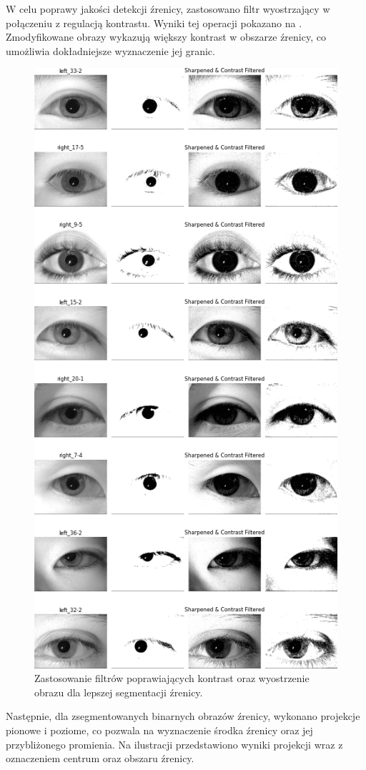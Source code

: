 \documentclass[a4paper]{article}
\begin{document}
W celu poprawy jakości detekcji źrenicy, zastosowano filtr wyostrzający w połączeniu z regulacją kontrastu. Wyniki tej operacji pokazano na . Zmodyfikowane obrazy wykazują większy kontrast w obszarze źrenicy, co umożliwia dokładniejsze wyznaczenie jej granic.

\begin{figure}[H]
    \centering
    \includegraphics[width=0.7\linewidth]{figures/eye_filters_many.png}
    \caption{Zastosowanie filtrów poprawiających kontrast oraz wyostrzenie obrazu dla lepszej segmentacji źrenicy.}
    \label{fig:eye_filters_many}
\end{figure}

Następnie, dla zsegmentowanych binarnych obrazów źrenicy, wykonano projekcje pionowe i poziome, co pozwala na wyznaczenie środka źrenicy oraz jej przybliżonego promienia. Na ilustracji  przedstawiono wyniki projekcji wraz z oznaczeniem centrum oraz obszaru źrenicy.
\end{document}
